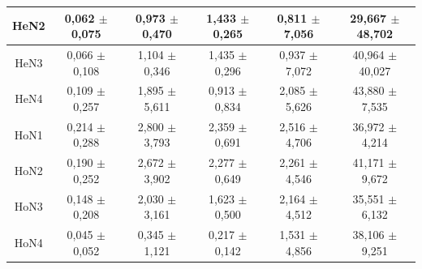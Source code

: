 \documentclass[final,1p,times]{elsarticle}
\begin{document}
\begin{table}[htb]
{\begin{tabular}{|c|c|c|c|c|c|}
HeN2    & 0,062 $\pm$  0,075  & 0,973  $\pm$ 0,470 &  1,433 $\pm$  0,265 &  0,811  $\pm$ 7,056 &  29,667 $\pm$ 48,702 \\ \hline
HeN3    & 0,066 $\pm$  0,108  & 1,104  $\pm$ 0,346 &  1,435 $\pm$  0,296 &  0,937  $\pm$ 7,072 &  40,964 $\pm$ 40,027 \\ \hline
HeN4    & 0,109 $\pm$  0,257  & 1,895  $\pm$ 5,611 &  0,913 $\pm$  0,834 &  2,085  $\pm$ 5,626 &  43,880 $\pm$ 7,535 \\ \hline \hline
HoN1    & 0,214 $\pm$  0,288  & 2,800  $\pm$ 3,793 &  2,359 $\pm$  0,691 &  2,516  $\pm$ 4,706 &  36,972 $\pm$ 4,214 \\ \hline
HoN2    & 0,190 $\pm$  0,252  & 2,672  $\pm$ 3,902 &  2,277 $\pm$  0,649 &  2,261  $\pm$ 4,546 &  41,171 $\pm$ 9,672 \\ \hline
HoN3    & 0,148 $\pm$  0,208  & 2,030  $\pm$ 3,161 &  1,623 $\pm$  0,500 &  2,164  $\pm$ 4,512 &  35,551 $\pm$  6,132 \\ \hline
HoN4    & 0,045 $\pm$  0,052  & 0,345  $\pm$ 1,121 &  0,217 $\pm$  0,142 &  1,531  $\pm$ 4,856 &  38,106 $\pm$ 9,251 \\ \hline
\end{tabular}
}
\label{tab:mmdptimes}
\end{table}
\end{document}
